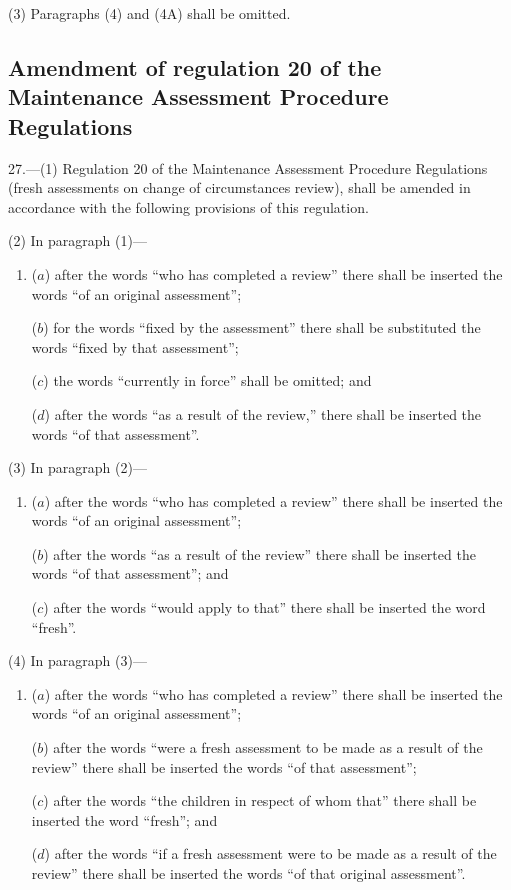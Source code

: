\documentclass[a4paper]{article}
\begin{document}
(3) Paragraphs (4) and (4A) shall be omitted.

\subsection[27. Amendment of regulation 20 of the Maintenance Assessment Procedure Regulations]{Amendment of regulation 20 of the Maintenance Assessment Procedure Regulations}

27.—(1) Regulation 20 of the Maintenance Assessment Procedure Regulations (fresh assessments on change of circumstances review), shall be amended in accordance with the following provisions of this regulation.

(2) In paragraph (1)—
\begin{enumerate}\item[]
($a$) after the words “who has completed a review” there shall be inserted the words “of an original assessment”;

($b$) for the words “fixed by the assessment” there shall be substituted the words “fixed by that assessment”;

($c$) the words “currently in force” shall be omitted; and

($d$) after the words “as a result of the review,” there shall be inserted the words “of that assessment”.
\end{enumerate}

(3) In paragraph (2)—
\begin{enumerate}\item[]
($a$) after the words “who has completed a review” there shall be inserted the words “of an original assessment”;

($b$) after the words “as a result of the review” there shall be inserted the words “of that assessment”; and

($c$) after the words “would apply to that” there shall be inserted the word “fresh”.
\end{enumerate}

(4) In paragraph (3)—
\begin{enumerate}\item[]
($a$) after the words “who has completed a review” there shall be inserted the words “of an original assessment”;

($b$) after the words “were a fresh assessment to be made as a result of the review” there shall be inserted the words “of that assessment”;

($c$) after the words “the children in respect of whom that” there shall be inserted the word “fresh”; and

($d$) after the words “if a fresh assessment were to be made as a result of the review” there shall be inserted the words “of that original assessment”.
\end{enumerate}
\end{document}
